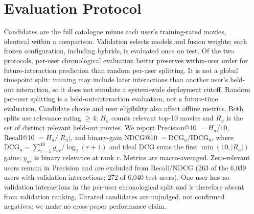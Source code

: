 \documentclass{article}
\begin{document}
\section{Evaluation Protocol}
Candidates are the full catalogue minus each user's training-rated movies,
identical within a comparison. Validation selects models and fusion weights;
each frozen configuration, including hybrids, is evaluated once on test. Of
the two protocols, per-user chronological
evaluation better preserves within-user order for future-interaction
prediction than random per-user splitting. It is not a global timepoint
split: training may include later interactions than another user's held-out
interaction, so it does not simulate a system-wide deployment cutoff.
Random per-user splitting is a held-out-interaction
evaluation, not a future-time evaluation. Candidate choice and user
eligibility also affect offline metrics. Both splits use
relevance rating $\geq4$; $H_u$ counts relevant top-10 movies and $R_u$ is
the set of distinct relevant held-out movies. We report
Precision@10 $=H_u/10$, Recall@10 $=H_u/|R_u|$, and binary-gain
NDCG@10 $=\mathrm{DCG}_u/\mathrm{IDCG}_u$, where
$\mathrm{DCG}_u=\sum_{r=1}^{10}y_{ur}/\log_2(r+1)$ and ideal DCG sums the
first $\min(10,|R_u|)$ gains; $y_{ur}$ is binary relevance at rank $r$.
Metrics are macro-averaged. Zero-relevant users remain in Precision and are
excluded from Recall/NDCG (263 of the 6,039 users with validation
interactions; 272 of 6,040 test users). One user has no validation interactions in the per-user chronological split
and is therefore absent from validation ranking.
Unrated candidates are unjudged, not confirmed negatives; we make no
cross-paper performance claim.
\end{document}
